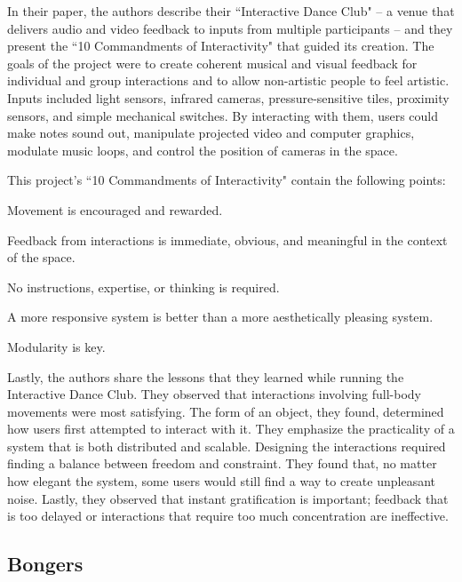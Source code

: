 In their paper, the authors describe their ``Interactive Dance Club" -- a venue that delivers audio and video feedback to inputs from multiple participants -- and they present the ``10 Commandments of Interactivity" that guided its creation. The goals of the project were to create coherent musical and visual feedback for individual and group interactions and to allow non-artistic people to feel artistic. Inputs included light sensors, infrared cameras, pressure-sensitive tiles, proximity sensors, and simple mechanical switches. By interacting with them, users could make notes sound out, manipulate projected video and computer graphics, modulate music loops, and control the position of cameras in the space.

This project's ``10 Commandments of Interactivity" contain the following points:
\begin{itemize*}
	\item Movement is encouraged and rewarded.
	\item Feedback from interactions is immediate, obvious, and meaningful in the context of the space.
	\item No instructions, expertise, or thinking is required.
	\item A more responsive system is better than a more aesthetically pleasing system.
	\item Modularity is key.
\end{itemize*}

Lastly, the authors share the lessons that they learned while running the Interactive Dance Club. They observed that interactions involving full-body movements were most satisfying. The form of an object, they found, determined how users first attempted to interact with it. They emphasize the practicality of a system that is both distributed and scalable. Designing the interactions required finding a balance between freedom and constraint. They found that, no matter how elegant the system, some users would still find a way to create unpleasant noise. Lastly, they observed that instant gratification is important; feedback that is too delayed or interactions that require too much concentration are ineffective.

\subsection{Bongers}

